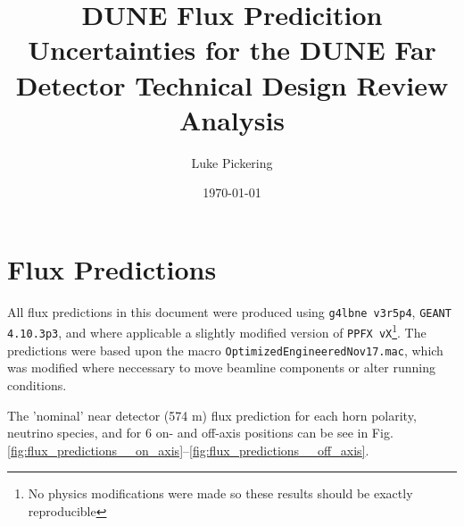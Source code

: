\documentclass{article}
\title{DUNE Flux Predicition Uncertainties for the DUNE Far Detector Technical Design Review Analysis}
\author{Luke Pickering}
\date{\today}
\begin{document}
\maketitle


\section{Flux Predictions}

All flux predictions in this document were produced using \texttt{g4lbne v3r5p4}, \texttt{GEANT 4.10.3p3}, and where applicable a slightly modified version of \texttt{PPFX vX}\footnote{No physics modifications were made so these results should be exactly reproducible}. The predictions were based upon the macro \texttt{OptimizedEngineeredNov17.mac}, which was modified where neccessary to move beamline components or alter running conditions.

The 'nominal' near detector (574 m) flux prediction for each horn polarity, neutrino species, and for 6 on- and off-axis positions can be see in Fig.\ref{fig:flux_predictions__on_axis}--\ref{fig:flux_predictions__off_axis}.
\end{document}
